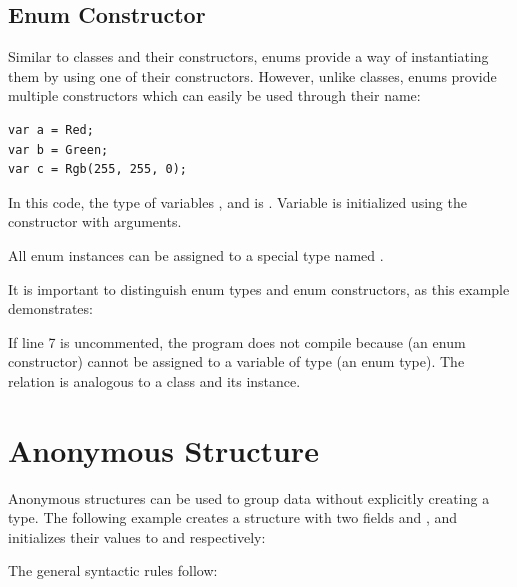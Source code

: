 \documentclass{haxe}
\begin{document}
\subsection{Enum Constructor}
\label{types-enum-constructor}

Similar to classes and their constructors, enums provide a way of instantiating them by using one of their constructors. However, unlike classes, enums provide multiple constructors which can easily be used through their name:

\begin{lstlisting}
var a = Red;
var b = Green;
var c = Rgb(255, 255, 0);
\end{lstlisting}
In this code, the type of variables ,  and  is . Variable  is initialized using the  constructor with arguments.

All enum instances can be assigned to a special type named .

It is important to distinguish enum types and enum constructors, as this example demonstrates:

If line 7 is uncommented, the program does not compile because  (an enum constructor) cannot be assigned to a variable of type  (an enum type). The relation is analogous to a class and its instance.


\section{Anonymous Structure}
\label{types-anonymous-structure}

Anonymous structures can be used to group data without explicitly creating a type. The following example creates a structure with two fields  and , and initializes their values to  and  respectively:

The general syntactic rules follow:
\end{document}
